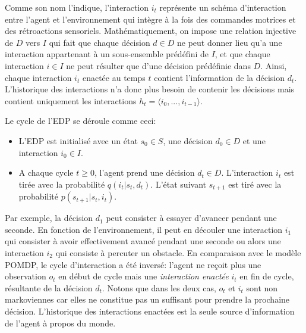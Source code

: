 Comme son nom l'indique, l'interaction $i_t$ représente un schéma d'interaction entre l'agent et l'environnement qui intègre à la fois des commandes motrices et des rétroactions sensoriels. 
Mathématiquement, on impose une relation injective de $D$ vers $I$ qui fait que chaque décision $d \in D$ ne peut donner lieu qu'a une interaction appartenant à un sous-ensemble prédéfini de $I$, et que chaque interaction $i \in I$ ne peut résulter que d'une décision prédéfinie dans $D$. 
Ainsi, chaque interaction $i_t$ enactée au temps $t$ contient l'information de la décision $d_t$.
L'historique des interactions n'a donc plus besoin de contenir les décisions mais contient uniquement les interactions $h_t = \langle i_0, ..., i_{t-1} \rangle$.

Le cycle de l'EDP se déroule comme ceci:
\begin{itemize}[label=\scalebox{.85}{$\diamond$}]
	\item L'EDP est initialisé avec un état $s_0 \in S$, une décision $d_0 \in D$ et une interaction $i_0 \in I$.
	\item A chaque cycle $t \geq 0$,
	l'agent prend une décision $d_t\in D$.
	L'interaction $i_t$ est tirée avec la probabilité $q(i_t|s_t,d_t)$.
	L'état suivant $s_{t+1}$ est tiré avec la probabilité $p(s_{t+1}|s_{t},i_{t})$.
\end{itemize}

Par exemple, la décision $d_1$ peut consister à essayer d'avancer pendant une seconde. 
En fonction de l'environnement, il peut en découler une interaction $i_1$ qui consister à avoir effectivement avancé pendant une seconde ou alors une interaction $i_2$ qui consiste à percuter un obstacle.
En comparaison avec le modèle POMDP, le cycle d'interaction a été inversé: l'agent ne reçoit plus une observation $o_t$ en début de cycle mais une \emph{interaction enactée} $i_t$ en fin de cycle, résultante de la décision $d_t$.
Notons que dans les deux cas, $o_t$ et $i_t$ sont non markoviennes car elles ne constitue pas un  suffisant pour prendre la prochaine décision. 
L'historique des interactions enactées est la seule source d'information de l'agent à propos du monde. 


